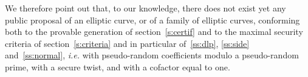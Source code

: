 \documentclass[twocolumn,letterpaper,10pt]{article}
\begin{document}
We therefore point out that, to our knowledge,
there does not exist yet any public proposal of an elliptic curve,
or of a family of elliptic curves, conforming both
to the provable generation of section~\ref{s:certif}
and to the maximal security criteria of section~\ref{s:criteria}
and in particular of~\ref{ss:dlp}, \ref{ss:side} and~\ref{ss:normal},
\emph{i.e.} with pseudo-random coefficients
modulo a pseudo-random prime,
with a secure twist,
and with a cofactor equal to one.



\end{document}
